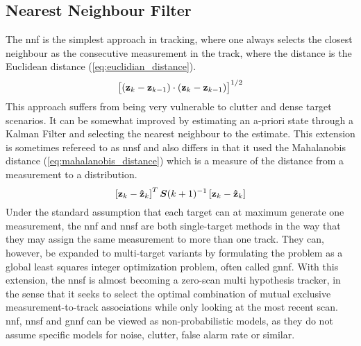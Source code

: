 \subsection{Nearest Neighbour Filter}
\label{sec:nn}
The \gls{nnf} is the simplest approach in tracking, where one always selects the closest neighbour as the consecutive \gls{measurement} in the track, where the distance is the Euclidean distance (\ref{eq:euclidian_distance}).
\begin{equation}
\left[ (\boldsymbol{\mathbf{z}}_k-\boldsymbol{\mathbf{z}}_{k-1}) \cdot (\boldsymbol{\mathbf{z}}_k-\boldsymbol{\mathbf{z}}_{k-1}) \right]^{1/2}
\label{eq:euclidian_distance}
\end{equation}
This approach suffers from being very vulnerable to clutter and dense \gls{target} scenarios. It can be somewhat improved by estimating an a-priori state through a Kalman Filter and selecting the nearest neighbour to the estimate. This extension is sometimes refereed to as \gls{nnsf} \cite{Bar-Shalom1998} and also differs in that it used the Mahalanobis distance (\ref{eq:mahalanobis_distance}) which is a measure of the distance from a \gls{measurement} to a distribution.
\begin{equation}
\left[ \boldsymbol{\mathbf{z}}_k - \boldsymbol{\mathbf{\hat{z}}}_{k} \right]^T \bm{S}(k+1)^{-1} \left[ \boldsymbol{\mathbf{z}}_k - \boldsymbol{\mathbf{\hat{z}}}_{k} \right]
\label{eq:mahalanobis_distance}
\end{equation}
Under the standard assumption that each \gls{target} can at maximum generate one \gls{measurement}, the \gls{nnf} and \gls{nnsf} are both single-\gls{target} methods in the way that they may assign the same \gls{measurement} to more than one track. They can, however, be expanded to multi-\gls{target} variants by formulating the problem as a global least squares integer optimization problem, often called \gls{gnnf}. With this extension, the \gls{nnsf} is almost becoming a zero-scan multi hypothesis tracker, in the sense that it seeks to select the optimal combination of mutual exclusive measurement-to-track associations while only looking at the most recent \gls{scan}. \gls{nnf}, \gls{nnsf} and \gls{gnnf} can be viewed as non-probabilistic models, as they do not assume specific models for noise, clutter, false alarm rate or similar.

